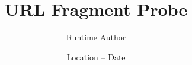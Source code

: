 \documentclass[12pt]{beamer}
\title{URL Fragment Probe}
\author{Runtime Author}
\date{Location -- Date}
\begin{document}
\frame{\titlepage}
\end{document}
